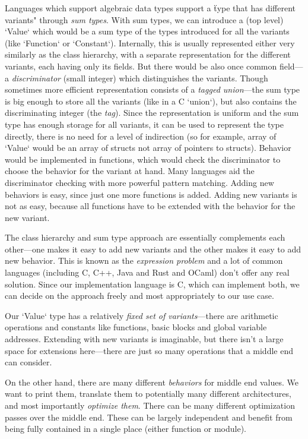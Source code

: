 Languages which support algebraic data types support a \"type that has different
variants" through {\em sum types}. With sum types, we can introduce a (top
level) `Value` which would be a sum type of the types introduced for all the
variants (like `Function` or `Constant`). Internally, this is usually
represented either very similarly as the class hierarchy, with a separate
representation for the different variants, each having only its fields. But there
would be also once common field---a {\em discriminator} (small integer) which
distinguishes the variants. Though sometimes more efficient representation
consists of a {\em tagged union}---the sum type is big enough to store all the
variants (like in a C `union`), but also contains the discriminating integer
(the {\em tag}). Since the representation is uniform and the sum type has enough
storage for all variants, it can be used to represent the type directly, there
is no need for a level of indirection (so for example, array of `Value` would be an
array of structs not array of pointers to structs). Behavior would be
implemented in functions, which would check the discriminator to choose the
behavior for the variant at hand. Many languages aid the discriminator checking
with more powerful pattern matching. Adding new behaviors is easy, since just
one more functions is added. Adding new variants is not as easy, because all
functions have to be extended with the behavior for the new variant.

The class hierarchy and sum type approach are essentially complements  each
other---one makes it easy to add new variants and the other makes it easy to add
new behavior. This is known as the {\em expression problem} and a lot of common
languages (including C, C++, Java and Rust and OCaml) don't offer any real
solution. Since our implementation language is C, which can implement both, we
can decide on the approach freely and most appropriately to our use case.

Our `Value` type has a relatively {\em fixed set of variants}---there are
arithmetic operations and constants like functions, basic blocks and global
variable addresses. Extending with new variants is imaginable, but there isn't a
large space for extensions here---there are just so many operations that a
middle end can consider.

On the other hand, there are many different {\em behaviors} for middle end
values. We want to print them, translate them to potentially many different
architectures, and most importantly {\em optimize them}. There can be many
different optimization passes over the middle end. These can be largely
independent and benefit from being fully contained in a single place (either
function or module).

